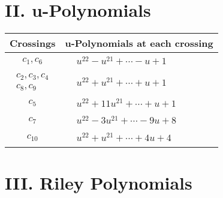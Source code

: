 \documentclass[1p]{elsarticle_modified}
\theoremstyle{definition}
\begin{document}
\newpage\renewcommand{\arraystretch}{1}
\centering \section*{ II. u-Polynomials}
\begin{tabular}{m{50pt}|m{274pt}}
Crossings & \hspace{64pt}u-Polynomials at each crossing \\
\hline $$\begin{aligned}c_{1},c_{6}\end{aligned}$$&$\begin{aligned}
&u^{22}- u^{21}+\cdots- u+1
\end{aligned}$\\
\hline $$\begin{aligned}c_{2},c_{3},c_{4}\\c_{8},c_{9}\end{aligned}$$&$\begin{aligned}
&u^{22}+u^{21}+\cdots+u+1
\end{aligned}$\\
\hline $$\begin{aligned}c_{5}\end{aligned}$$&$\begin{aligned}
&u^{22}+11 u^{21}+\cdots+u+1
\end{aligned}$\\
\hline $$\begin{aligned}c_{7}\end{aligned}$$&$\begin{aligned}
&u^{22}-3 u^{21}+\cdots-9 u+8
\end{aligned}$\\
\hline $$\begin{aligned}c_{10}\end{aligned}$$&$\begin{aligned}
&u^{22}+u^{21}+\cdots+4 u+4
\end{aligned}$\\
\hline
\end{tabular}\newpage\renewcommand{\arraystretch}{1}
\centering \section*{ III. Riley Polynomials}
\end{document}
